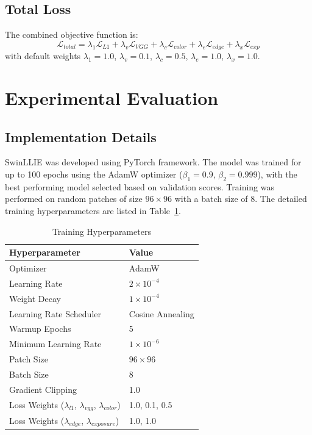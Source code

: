 \documentclass[conference]{IEEEtran}
\begin{document}
\subsection{Total Loss}
The combined objective function is:
\begin{equation}
\mathcal{L}_{total} = \lambda_1 \mathcal{L}_{L1} + \lambda_v \mathcal{L}_{VGG} + \lambda_c \mathcal{L}_{color} + \lambda_e \mathcal{L}_{edge} + \lambda_x \mathcal{L}_{exp}
\end{equation}
with default weights $\lambda_1 = 1.0$, $\lambda_v = 0.1$, $\lambda_c = 0.5$, $\lambda_e = 1.0$, $\lambda_x = 1.0$.

\section{Experimental Evaluation}

\subsection{Implementation Details}

SwinLLIE was developed using PyTorch framework. The model was trained for up to 100 epochs using the AdamW optimizer ($\beta_1 = 0.9$, $\beta_2 = 0.999$), with the best performing model selected based on validation scores. Training was performed on random patches of size $96 \times 96$ with a batch size of 8. The detailed training hyperparameters are listed in Table~\ref{tab:training_config}.

\begin{table}[htbp]
\caption{Training Hyperparameters}
\centering
\begin{tabular}{ll}
\toprule
\textbf{Hyperparameter} & \textbf{Value} \\
\midrule
Optimizer & AdamW \\
Learning Rate & $2 \times 10^{-4}$ \\
Weight Decay & $1 \times 10^{-4}$ \\
Learning Rate Scheduler & Cosine Annealing \\
Warmup Epochs & 5 \\
Minimum Learning Rate & $1 \times 10^{-6}$ \\
Patch Size & $96 \times 96$ \\
Batch Size & 8 \\
Gradient Clipping & 1.0 \\
\midrule
Loss Weights ($\lambda_{l1}$, $\lambda_{vgg}$, $\lambda_{color}$) & 1.0, 0.1, 0.5 \\
Loss Weights ($\lambda_{edge}$, $\lambda_{exposure}$) & 1.0, 1.0 \\
\bottomrule
\end{tabular}
\label{tab:training_config}
\end{table}
\end{document}
